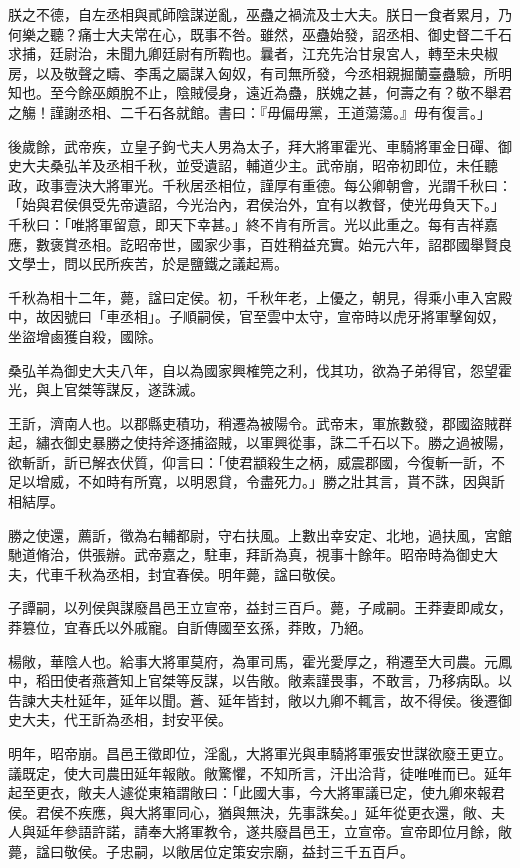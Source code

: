 \begin{pinyinscope}
朕之不德，自左丞相與貳師陰謀逆亂，巫蠱之禍流及士大夫。朕日一食者累月，乃何樂之聽？痛士大夫常在心，既事不咎。雖然，巫蠱始發，詔丞相、御史督二千石求捕，廷尉治，未聞九卿廷尉有所鞫也。曩者，江充先治甘泉宮人，轉至未央椒房，以及敬聲之疇、李禹之屬謀入匈奴，有司無所發，今丞相親掘蘭臺蠱驗，所明知也。至今餘巫頗脫不止，陰賊侵身，遠近為蠱，朕媿之甚，何壽之有？敬不舉君之觴！謹謝丞相、二千石各就館。書曰：『毋偏毋黨，王道蕩蕩。』毋有復言。」

後歲餘，武帝疾，立皇子鉤弋夫人男為太子，拜大將軍霍光、車騎將軍金日磾、御史大夫桑弘羊及丞相千秋，並受遺詔，輔道少主。武帝崩，昭帝初即位，未任聽政，政事壹決大將軍光。千秋居丞相位，謹厚有重德。每公卿朝會，光謂千秋曰：「始與君侯俱受先帝遺詔，今光治內，君侯治外，宜有以教督，使光毋負天下。」千秋曰：「唯將軍留意，即天下幸甚。」終不肯有所言。光以此重之。每有吉祥嘉應，數褒賞丞相。訖昭帝世，國家少事，百姓稍益充實。始元六年，詔郡國舉賢良文學士，問以民所疾苦，於是鹽鐵之議起焉。

千秋為相十二年，薨，諡曰定侯。初，千秋年老，上優之，朝見，得乘小車入宮殿中，故因號曰「車丞相」。子順嗣侯，官至雲中太守，宣帝時以虎牙將軍擊匈奴，坐盜增鹵獲自殺，國除。

桑弘羊為御史大夫八年，自以為國家興榷筦之利，伐其功，欲為子弟得官，怨望霍光，與上官桀等謀反，遂誅滅。

王訢，濟南人也。以郡縣吏積功，稍遷為被陽令。武帝末，軍旅數發，郡國盜賊群起，繡衣御史暴勝之使持斧逐捕盜賊，以軍興從事，誅二千石以下。勝之過被陽，欲斬訢，訢已解衣伏質，仰言曰：「使君顓殺生之柄，威震郡國，今復斬一訢，不足以增威，不如時有所寬，以明恩貸，令盡死力。」勝之壯其言，貰不誅，因與訢相結厚。

勝之使還，薦訢，徵為右輔都尉，守右扶風。上數出幸安定、北地，過扶風，宮館馳道脩治，供張辦。武帝嘉之，駐車，拜訢為真，視事十餘年。昭帝時為御史大夫，代車千秋為丞相，封宜春侯。明年薨，諡曰敬侯。

子譚嗣，以列侯與謀廢昌邑王立宣帝，益封三百戶。薨，子咸嗣。王莽妻即咸女，莽篡位，宜春氏以外戚寵。自訢傳國至玄孫，莽敗，乃絕。

楊敞，華陰人也。給事大將軍莫府，為軍司馬，霍光愛厚之，稍遷至大司農。元鳳中，稻田使者燕蒼知上官桀等反謀，以告敞。敞素謹畏事，不敢言，乃移病臥。以告諫大夫杜延年，延年以聞。蒼、延年皆封，敞以九卿不輒言，故不得侯。後遷御史大夫，代王訢為丞相，封安平侯。

明年，昭帝崩。昌邑王徵即位，淫亂，大將軍光與車騎將軍張安世謀欲廢王更立。議既定，使大司農田延年報敞。敞驚懼，不知所言，汗出洽背，徒唯唯而已。延年起至更衣，敞夫人遽從東箱謂敞曰：「此國大事，今大將軍議已定，使九卿來報君侯。君侯不疾應，與大將軍同心，猶與無決，先事誅矣。」延年從更衣還，敞、夫人與延年參語許諾，請奉大將軍教令，遂共廢昌邑王，立宣帝。宣帝即位月餘，敞薨，諡曰敬侯。子忠嗣，以敞居位定策安宗廟，益封三千五百戶。


\end{pinyinscope}
